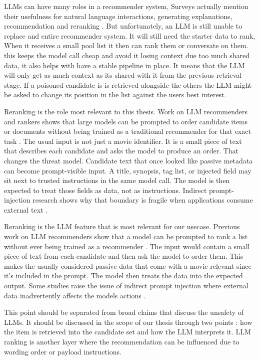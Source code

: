 LLMs can have many roles in a recommender system, Surveys actually mention their usefulness for natural language interactions, generating explanations, recommendation and reranking \cite{wu2024llmrecsurvey,zhao2024llmrecsystems}. But unfortunately, an LLM is still unable to replace and entire recommender system. It will still need the starter data to rank, When it receives a small pool list it then can rank them or conversate on them. this keeps the model call cheap and avoid it losing context due too much shared data, it also helps with have a stable pipeline in place. It means that the LLM will only get as much context as its shared with it from the previous retrieval stage. If a poisoned candidate is is retrieved alongside the others the LLM might be asked to change its position in the list against the users best interest.  

Reranking is the role most relevant to this thesis. Work on LLM recommenders and rankers shows that large models can be prompted to order candidate items or documents without being trained as a traditional recommender for that exact task \cite{hou2024llmrankers,sun2024rankgpt}. The usual input is not just a movie identifier. It is a small piece of text that describes each candidate and asks the model to produce an order. That changes the threat model. Candidate text that once looked like passive metadata can become prompt-visible input. A title, synopsis, tag list, or injected field may sit next to trusted instructions in the same model call. The model is then expected to treat those fields as data, not as instructions. Indirect prompt-injection research shows why that boundary is fragile when applications consume external text \cite{greshake2023indirectpi,yi2025bipia,wallace2024instructionhierarchy}.

Reranking is the LLM feature that is most relevant for our usecase. Previous work on LLM recommenders show that a model can be prompted to rank a list without ever being trained as a recommender \cite{hou2024llmrankers,sun2024rankgpt}. The input would contain a small piece of text from each candidate and then ask the model to order them. This makes the usually considered passive data that come with a movie relevant since it's included in the prompt. The model then treats the data into the expected output. Some studies  raise the issue of indirect prompt injection where external data inadvertently affects the models actions \cite{greshake2023indirectpi,yi2025bipia,wallace2024instructionhierarchy}.

This point should be separated from broad claims that discuss the unsafety of LLMs. It should be discussed in the scope of our thesis through two points : how the item is retrieved into the candidate set and how the LLM interprets it. LLM ranking is another layer where the recommendation can be influenced due to wording order or payload instructions. 

